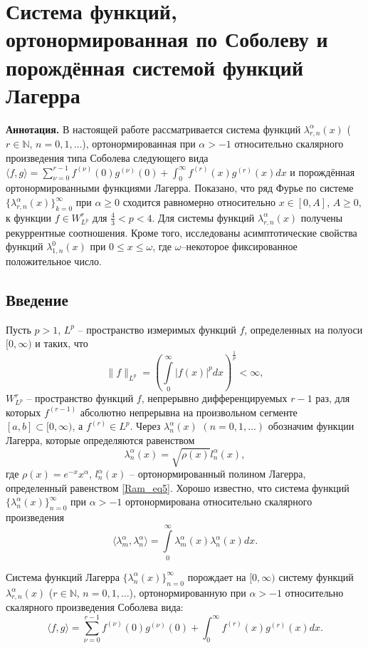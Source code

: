 \documentclass[a4paper,12pt]{article}
\begin{document}
\section{Система функций, ортонормированная по Соболеву и порождённая системой функций Лагерра}

{\bf Аннотация.} В настоящей работе рассматривается система функций $\lambda_{r,n}^{\alpha}(x)$ ($r\in\mathbb{N}$, $n=0, 1, \ldots$), ортонормированная при $\alpha>-1$ относительно скалярного произведения типа Соболева следующего вида $\langle f,g\rangle=\sum_{\nu=0}^{r-1}f^{(\nu)}(0)g^{(\nu)}(0)+\int_{0}^{\infty} f^{(r)}(x)g^{(r)}(x) dx$ и порождённая ортонормированными функциями Лагерра.
Показано, что ряд Фурье по системе $\{\lambda_{r,n}^{\alpha}(x)\}_{k=0}^\infty$ при $\alpha\geq0$ сходится равномерно относительно $x\in[0, A]$, $A\geq0,$ к функции $f\in W^r_{L^p}$ для $\frac{4}{3}<p<4$.
Для системы функций $\lambda_{r,n}^{\alpha}(x)$ получены рекуррентные соотношения.
Кроме того, исследованы асимптотические свойства функций $\lambda_{1,n}^0(x)$ при $0\leq x\leq\omega$, где $\omega$--некоторое фиксированное положительное число.


\subsection{Введение}
Пусть $p>1$, $L^p$ -- пространство измеримых функций $f$, определенных на полуоси $[0, \infty)$ и таких, что
$$
\|f\|_{L^p}=\left(\int\limits_0^{\infty}|f(x)|^pdx\right)^\frac{1}{p}<\infty,
$$
$W^r_{L^p}$ -- пространство функций $f$, непрерывно дифференцируемых $r-1$ раз, для которых $f^{(r-1)}$ абсолютно непрерывна на произвольном сегменте $[a, b]\subset[0, \infty)$, а $f^{(r)}\in L^p$.
Через $\lambda_n^\alpha(x)$ $(n=0, 1, \ldots)$ обозначим функции Лагерра, которые определяются равенством
\begin{equation}\label{funcLag}
\lambda_n^\alpha(x)=\sqrt{\rho(x)}l_n^\alpha(x),
\end{equation}
где $\rho(x)=e^{-x}x^\alpha$, $l_n^\alpha(x)$ -- ортонормированный полином Лагерра, определенный равенством \eqref{Ram_eq5}.
Хорошо известно, что система функций $\{\lambda_n^\alpha(x)\}_{n=0}^\infty$ при $\alpha>-1$ ортонормирована относительно скалярного произведения
$$
\langle \lambda_m^\alpha, \lambda_n^\alpha\rangle=\int\limits_0^\infty \lambda_m^\alpha(x)\lambda_n^\alpha(x)dx.
$$

Система функций Лагерра $\{\lambda_n^\alpha(x)\}_{n=0}^\infty$ порождает на $[0, \infty)$ систему функций $\lambda_{r,n}^\alpha(x)$ ($r\in\mathbb{N}$, $n=0, 1, \ldots$), ортонормированную при $\alpha>-1$ относительно скалярного произведения Соболева вида:
\begin{equation}\label{Ram_eq1}
\langle f,g\rangle=\sum_{\nu=0}^{r-1}f^{(\nu)}(0)g^{(\nu)}(0)+\int_{0}^{\infty} f^{(r)}(x)g^{(r)}(x)dx.
\end{equation}
\end{document}
